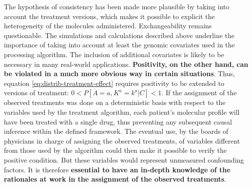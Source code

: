 \documentclass[a4paper,12pt,twoside,onecolumn,openright,final,oldfontcommands]{memoir}
\begin{document}
The hypothesis of consistency has been made more plausible by taking
into account the treatment versions, which makes it possible to explicit
the heterogeneity of the molecules administered. Exchangeability remains
questionable. The simulations and calculations described above underline
the importance of taking into account at least the genomic covariates
used in the processing algorithm. The inclusion of additional covariates
is likely to be necessary in many real-world applications.
\textbf{Positivity, on the other hand, can be violated in a much more
obvious way in certain situations}. Thus, equation
\eqref{eq:distrib-treatment-effect} requires positivity to be extended to
versions of treatment: \(0<P[A=a, K^a=k^a|C]<1\). If the assignment of
the observed treatments was done on a deterministic basis with respect
to the variables used by the treatment algorithm, each patient's
molecular profile will have been treated with a single drug, thus
preventing any subsequent causal inference within the defined framework.
The eventual use, by the boards of physicians in charge of assigning the
observed treatments, of variables different from those used by the
algorithm could then make it possible to verify the positive condition.
But these variables would represent unmeasured confounding factors. It
is therefore \textbf{essential to have an in-depth knowledge of the
rationales at work in the assignment of the observed treatments}.
\end{document}

